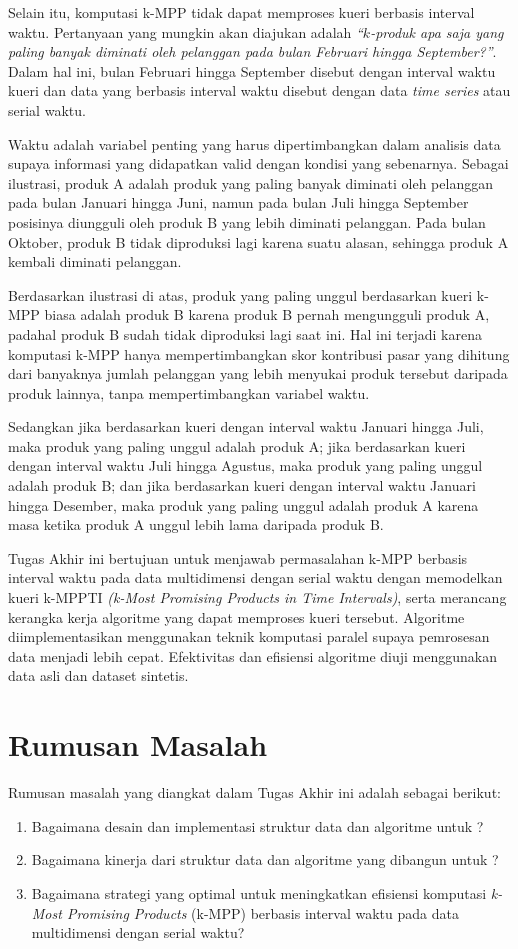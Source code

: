 Selain itu, komputasi k-MPP tidak dapat memproses kueri berbasis interval waktu. Pertanyaan yang mungkin akan diajukan adalah \textit{“$k$-produk apa saja yang paling banyak diminati oleh pelanggan pada bulan Februari hingga September?”}. Dalam hal ini, bulan Februari hingga September disebut dengan interval waktu kueri dan data yang berbasis interval waktu disebut dengan data \textit{time series} atau serial waktu.

Waktu adalah variabel penting yang harus dipertimbangkan dalam analisis data supaya informasi yang didapatkan valid dengan kondisi yang sebenarnya. Sebagai ilustrasi, produk A adalah produk yang paling banyak diminati oleh pelanggan pada bulan Januari hingga Juni, namun pada bulan Juli hingga September posisinya diungguli oleh produk B yang lebih diminati pelanggan. Pada bulan Oktober, produk B tidak diproduksi lagi karena suatu alasan, sehingga produk A kembali diminati pelanggan.  

Berdasarkan ilustrasi di atas, produk yang paling unggul berdasarkan kueri k-MPP biasa adalah produk B karena produk B pernah mengungguli produk A, padahal produk B sudah tidak diproduksi lagi saat ini. Hal ini terjadi karena komputasi k-MPP hanya mempertimbangkan skor kontribusi pasar yang dihitung dari banyaknya jumlah pelanggan yang lebih menyukai produk tersebut daripada produk lainnya, tanpa mempertimbangkan variabel waktu.

Sedangkan jika berdasarkan kueri dengan interval waktu Januari hingga Juli, maka produk yang paling unggul adalah produk A; jika berdasarkan kueri dengan interval waktu Juli hingga Agustus, maka produk yang paling unggul adalah produk B; dan jika berdasarkan kueri dengan interval waktu Januari hingga Desember, maka produk yang paling unggul adalah produk A karena masa ketika produk A unggul lebih lama daripada produk B.

Tugas Akhir ini bertujuan untuk menjawab permasalahan k-MPP berbasis interval waktu pada data multidimensi dengan serial waktu dengan memodelkan kueri k-MPPTI \textit{(k-Most Promising Products in Time Intervals)}, serta merancang kerangka kerja algoritme yang dapat memproses kueri tersebut. Algoritme diimplementasikan menggunakan teknik komputasi paralel supaya pemrosesan data menjadi lebih cepat. Efektivitas dan efisiensi algoritme diuji menggunakan data asli dan dataset sintetis.

\section{Rumusan Masalah}
\tab Rumusan masalah yang diangkat dalam Tugas Akhir ini adalah sebagai berikut:
\begin{enumerate}
	\item Bagaimana desain dan implementasi struktur data dan algoritme untuk \problemm?
	\item Bagaimana kinerja dari struktur data dan algoritme yang dibangun untuk \problemm?
	\item Bagaimana strategi yang optimal untuk meningkatkan efisiensi komputasi \textit{k-Most Promising Products} (k-MPP) berbasis interval waktu pada data multidimensi dengan serial waktu?
\end{enumerate}

